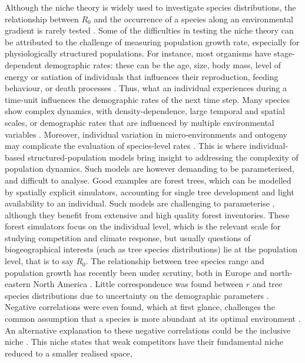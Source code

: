Although the niche theory is widely used to investigate species distributions,
the relationship between $ R_0 $ and the occurrence of a species along an
environmental gradient is rarely tested \citep{McGill2012}. Some of the
difficulties in testing the niche theory can be attributed to the challenge of
measuring population growth rate, especially for physiologically structured
populations. For instance, most organisms have stage-dependent demographic
rates: these can be the age, size, body mass, level of energy or satiation of
individuals that influences their reproduction, feeding behaviour, or death
processes \citep[and references therein]{DeRoos1997}. Thus, what an individual experiences during
a time-unit influences the demographic rates of the next time step. Many
species show complex dynamics, with density-dependence, large temporal and
spatial scales, or demographic rates that are influenced by multiple
environmental variables \citep{DeRoos1997}. Moreover, individual variation in
micro-environments and ontogeny may complicate the evaluation of species-level
rates \citep{Clark2011}. This is where individual-based structured-population
models bring insight to addressing the complexity of population dynamics.
Such models are however demanding to be parameterised, and difficult to
analyse. Good examples are forest trees, which can be modelled by spatially
explicit simulators, accounting for single tree development and light
availability to an individual. Such models are challenging to parameterise \citep{Pacala1996},
although they benefit from extensive and high quality forest inventories.
These forest simulators focus on the individual level, which is the relevant
scale for studying competition and climate response, but usually questions of
biogeographical interests (such as tree species distributions) lie at the
population level, that is to say $ R_0 $. The relationship between tree
species range and population growth has recently been under scrutiny, both in
Europe \citep{Thuiller2014} and north-eastern North America
\citep{McGill2012}. Little correspondence was found between $ r $ and
tree species distributions due to uncertainty on the demographic parameters \citep{Thuiller2014}. Negative
correlations were even found, which at first glance, challenges the common
assumption that a species is more abundant at its optimal environment
\citep{McGill2012}. An alternative explanation to these negative correlations
could be the inclusive niche \citep{McGill2012}. This niche states that weak
competitors have their fundamental niche reduced to a smaller realised space,
